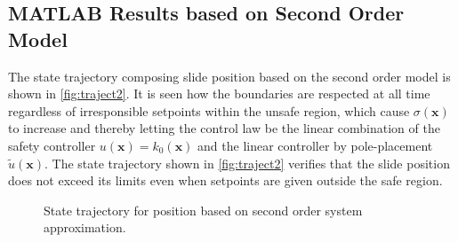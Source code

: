 \subsection{MATLAB Results based on Second Order Model}\label{subsec:matlab-resutls-2-order}
\vspace{-0.2cm}
The state trajectory composing slide position based on the second order model is shown in \autoref{fig:traject2}.
It is seen how the boundaries are respected at all time regardless of irresponsible setpoints within the unsafe region, which cause $\sigma(\mathbf{x})$ to increase and thereby letting the control law be the linear combination of the safety controller $u(\mathbf{x}) = k_0(\mathbf{x})$ and the linear controller by pole-placement $\tilde{u}(\mathbf{x})$.
The state trajectory shown in \autoref{fig:traject2} verifies that the slide position does not exceed its limits even when setpoints are given outside the safe region.
\vspace{-2mm}
\begin{figure}[H]
\hspace*{-5mm}\vspace*{-1mm}
%
%
\caption{State trajectory for position based on second order system approximation.}
\label{fig:traject2}
\end{figure}
%
%
%
%


